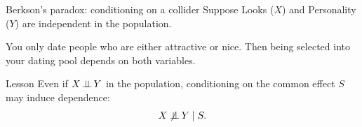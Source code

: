 \documentclass[dvipsnames,aspectratio=169,handout]{beamer}
\begin{document}
\begin{frame}{Berkson's paradox: conditioning on a collider}
Suppose Looks ($X$) and Personality ($Y$) are independent in the population.

\medskip

You only date people who are either attractive or nice.
Then being selected into your dating pool depends on both variables.

\begin{center}
\end{center}

\begin{alertblock}{Lesson}
Even if $X\mbox{\,$\perp\!\!\!\perp$\,} Y$ in the population,
conditioning on the common effect $S$ may induce dependence:
\[
X \not\!\!\!\mbox{\,$\perp\!\!\!\perp$\,} Y\mid S.
\]
\end{alertblock}
\end{frame}
\end{document}
